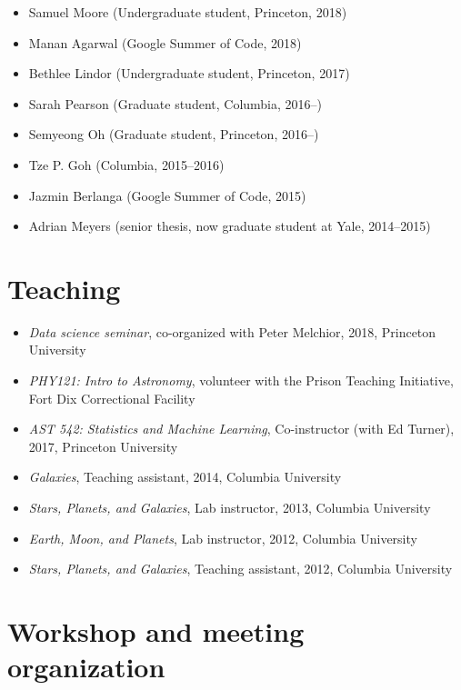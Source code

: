 \documentclass[12pt,letterpaper]{article}
\begin{document}
\begin{itemize}
    \item Samuel Moore (Undergraduate student, Princeton, 2018)
    \item Manan Agarwal (Google Summer of Code, 2018)
    \item Bethlee Lindor (Undergraduate student, Princeton, 2017)
    \item Sarah Pearson (Graduate student, Columbia, 2016--)
    \item Semyeong Oh (Graduate student, Princeton, 2016--)
	\item Tze P. Goh (Columbia, 2015--2016)
	\item Jazmin Berlanga (Google Summer of Code, 2015)
	\item Adrian Meyers (senior thesis, now graduate student at Yale, 2014--2015)
\end{itemize}

\section*{Teaching}

\begin{itemize}
    \item \emph{Data science seminar}, co-organized with Peter Melchior, 2018, Princeton University
    \item \emph{PHY121: Intro to Astronomy}, volunteer with the Prison Teaching Initiative, Fort Dix Correctional Facility
	\item \emph{AST 542: Statistics and Machine Learning}, Co-instructor (with Ed Turner), 2017, Princeton University
    \item \emph{Galaxies}, Teaching assistant, 2014, Columbia University
	\item \emph{Stars, Planets, and Galaxies}, Lab instructor, 2013, Columbia University
	\item \emph{Earth, Moon, and Planets}, Lab instructor, 2012, Columbia University
	\item \emph{Stars, Planets, and Galaxies}, Teaching assistant, 2012, Columbia University
\end{itemize}

\section*{Workshop and meeting organization}
\end{document}
